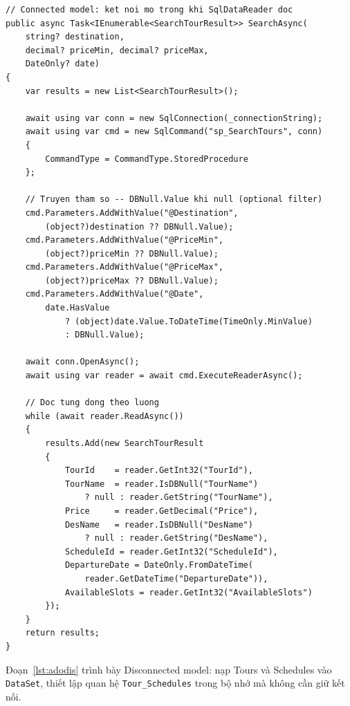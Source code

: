 \begin{lstlisting}[style=csharp,
  caption={ADO.NET Connected Model -- gọi sp\_SearchTours},
  label={lst:adocon}]
// Connected model: ket noi mo trong khi SqlDataReader doc
public async Task<IEnumerable<SearchTourResult>> SearchAsync(
    string? destination,
    decimal? priceMin, decimal? priceMax,
    DateOnly? date)
{
    var results = new List<SearchTourResult>();

    await using var conn = new SqlConnection(_connectionString);
    await using var cmd = new SqlCommand("sp_SearchTours", conn)
    {
        CommandType = CommandType.StoredProcedure
    };

    // Truyen tham so -- DBNull.Value khi null (optional filter)
    cmd.Parameters.AddWithValue("@Destination",
        (object?)destination ?? DBNull.Value);
    cmd.Parameters.AddWithValue("@PriceMin",
        (object?)priceMin ?? DBNull.Value);
    cmd.Parameters.AddWithValue("@PriceMax",
        (object?)priceMax ?? DBNull.Value);
    cmd.Parameters.AddWithValue("@Date",
        date.HasValue
            ? (object)date.Value.ToDateTime(TimeOnly.MinValue)
            : DBNull.Value);

    await conn.OpenAsync();
    await using var reader = await cmd.ExecuteReaderAsync();

    // Doc tung dong theo luong
    while (await reader.ReadAsync())
    {
        results.Add(new SearchTourResult
        {
            TourId    = reader.GetInt32("TourId"),
            TourName  = reader.IsDBNull("TourName")
                ? null : reader.GetString("TourName"),
            Price     = reader.GetDecimal("Price"),
            DesName   = reader.IsDBNull("DesName")
                ? null : reader.GetString("DesName"),
            ScheduleId = reader.GetInt32("ScheduleId"),
            DepartureDate = DateOnly.FromDateTime(
                reader.GetDateTime("DepartureDate")),
            AvailableSlots = reader.GetInt32("AvailableSlots")
        });
    }
    return results;
}
\end{lstlisting}

Đoạn~\ref{lst:adodis} trình bày Disconnected model: nạp Tours
và Schedules vào \texttt{DataSet}, thiết lập quan hệ
\texttt{Tour\_Schedules} trong bộ nhớ mà không cần giữ kết nối.

